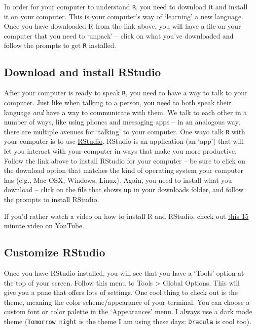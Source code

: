 \documentclass[
]{book}
\begin{document}
In order for your computer to understand \texttt{R}, you need to download it and install it on your computer. This is your computer's way of `learning' a new language. Once you have downloaded R from the link above, you will have a file on your computer that you need to `unpack' -- click on what you've downloaded and follow the prompts to get \texttt{R} installed.

\hypertarget{download-and-install-rstudio}{%
\subsection{Download and install RStudio}\label{download-and-install-rstudio}}

After your computer is ready to speak \texttt{R}, you need to have a way to talk to your computer. Just like when talking to a person, you need to both speak their language \emph{and} have a way to communicate with them. We talk to each other in a number of ways, like using phones and messaging apps -- in an analogous way, there are multiple avenues for `talking' to your computer. One wayo talk \texttt{R} with your computer is to use \href{https://posit.co/download/rstudio-desktop/}{RStudio}. RStudio is an application (an `app') that will let you interact with your computer in ways that make you more productive. Follow the link above to install RStudio for your computer -- be sure to click on the download option that matches the kind of operating system your computer has (e.g., Mac OSX, Windows, Linux). Again, you need to install what you download -- click on the file that shows up in your downloads folder, and follow the prompts to install RStudio.

If you'd rather watch a video on how to install R and RStudio, check out \href{https://www.youtube.com/watch?v=lVKMsaWju8w}{this 15 minute video on YouTube}.

\hypertarget{customize-rstudio}{%
\subsection{Customize RStudio}\label{customize-rstudio}}

Once you have RStudio installed, you will see that you have a `Tools' option at the top of your screen. Follow this menu to Tools \textgreater{} Global Options. This will give you a pane that offers lots of settings. One cool thing to check out is the theme, meaning the color scheme/appearance of your terminal. You can choose a custom font or color palette in the `Appearances' menu. I always use a dark mode theme (\texttt{Tomorrow\ night} is the theme I am using these days; \texttt{Dracula} is cool too).
\end{document}
